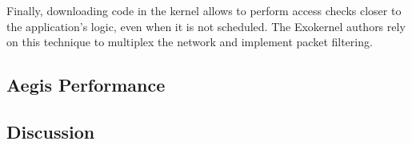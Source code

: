 Finally, downloading code in the kernel allows to perform access checks closer to the application's logic, even when it is not scheduled.
The Exokernel authors rely on this technique to multiplex the network and implement packet filtering. 











\subsection{Aegis Performance}

\subsection{Discussion}




